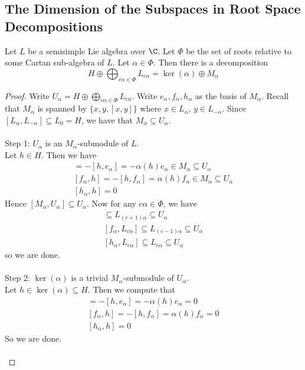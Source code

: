 \documentclass[a4paper]{article}
\begin{document}
\subsection{The Dimension of the Subspaces in Root Space Decompositions}
\begin{lmm}{}{} Let $L$ be a semisimple Lie algebra over $\C$. Let $\Phi$ be the set of roots relative to some Cartan sub-algebra of $L$. Let $\alpha\in\Phi$. Then there is a decomposition $$H\oplus\bigoplus_{c\alpha\in\Phi}L_{c\alpha}=\ker(\alpha)\oplus M_\alpha$$ \tcbline
\begin{proof}
Write $U_\alpha=H\oplus\bigoplus_{c\alpha\in\Phi}L_{c\alpha}$. Write $e_\alpha,f_\alpha,h_\alpha$ as the basis of $M_\alpha$. Recall that $M_\alpha$ is spanned by $\{x,y,[x,y]\}$ where $x\in L_\alpha$, $y\in L_{-\alpha}$. Since $[L_\alpha,L_{-\alpha}]\subseteq L_0=H$, we have that $M_\alpha\subseteq U_\alpha$. \\~\\

Step 1: $U_\alpha$ is an $M_\alpha$-submodule of $L$. \\
Let $h\in H$. Then we have 
\begin{align*}
[e_\alpha,h]=-[h,e_\alpha]=-\alpha(h)e_\alpha\in M_\alpha\subseteq U_\alpha\\
[f_\alpha,h]=-[h,f_\alpha]=\alpha(h)f_\alpha\in M_\alpha\subseteq U_\alpha\\
[h_\alpha,h]=0\tag{Since $H=C_L(H)$}
\end{align*}
Hence $[M_\alpha,U_\alpha]\subseteq U_\alpha$. Now for any $c\alpha\in\Phi$, we have 
\begin{align*}
[e_\alpha,L_{c\alpha}]\subseteq L_{(c+1)\alpha}\subseteq U_\alpha\\
[f_\alpha,L_{c\alpha}]\subseteq L_{(c-1)\alpha}\subseteq U_\alpha\\
[h_\alpha,L_{c\alpha}]\subseteq L_{c\alpha}\subseteq U_\alpha
\end{align*}
so we are done. \\~\\

Step 2: $\ker(\alpha)$ is a trivial $M_\alpha$-submodule of $U_\alpha$. \\
Let $h\in\ker(\alpha)\subseteq H$. Then we compute that 
\begin{align*}
[e_\alpha,h]=-[h,e_\alpha]=-\alpha(h)e_\alpha=0\\
[f_\alpha,h]=-[h,f_\alpha]=\alpha(h)f_\alpha=0\\
[h_\alpha,h]=0\tag{Since $H=C_L(H)$}
\end{align*}
So we are done. \\~\\


\end{proof}
\end{lmm}
\end{document}
